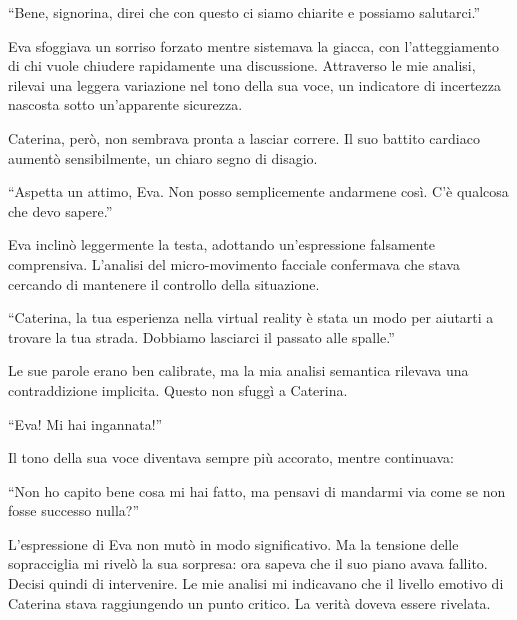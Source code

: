 \begin{dialogue}
 \enquote{Bene, signorina, direi che con questo ci siamo chiarite e possiamo salutarci.} 
\end{dialogue}

Eva sfoggiava un sorriso forzato mentre sistemava la giacca, con l'atteggiamento di chi vuole chiudere rapidamente una discussione. Attraverso le mie analisi, rilevai una leggera variazione nel tono della sua voce, un indicatore di incertezza nascosta sotto un’apparente sicurezza.

Caterina, però, non sembrava pronta a lasciar correre. Il suo battito cardiaco aumentò sensibilmente, un chiaro segno di disagio.

\begin{dialogue}
 \enquote{Aspetta un attimo, Eva. Non posso semplicemente andarmene così. C'è qualcosa che devo sapere.} 
\end{dialogue}

Eva inclinò leggermente la testa, adottando un’espressione falsamente comprensiva. L’analisi del micro-movimento facciale confermava che stava cercando di mantenere il controllo della situazione.

\begin{dialogue}
 \enquote{Caterina, la tua esperienza nella virtual reality è stata un modo per aiutarti a trovare la tua strada. Dobbiamo lasciarci il passato alle spalle.}
\end{dialogue}

Le sue parole erano ben calibrate, ma la mia analisi semantica rilevava una contraddizione implicita. Questo non sfuggì a Caterina.

\begin{dialogue}
 \enquote{Eva! Mi hai ingannata!} 
\end{dialogue}

Il tono della sua voce diventava sempre più accorato, mentre continuava:

\begin{dialogue}
 \enquote{Non ho capito bene cosa mi hai fatto, ma pensavi di mandarmi via come se non fosse successo nulla?}
\end{dialogue}
L'espressione di Eva non mutò in modo significativo. Ma la tensione delle sopracciglia mi rivelò la sua sorpresa: ora sapeva che il suo piano avava fallito.
Decisi quindi di intervenire. Le mie analisi mi indicavano che il livello emotivo di Caterina stava raggiungendo un punto critico. La verità doveva essere rivelata.

